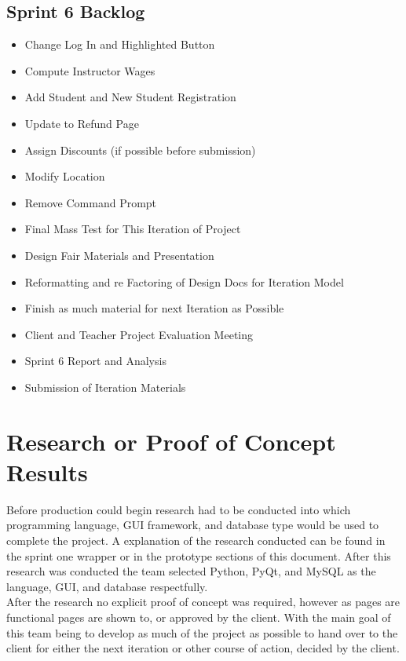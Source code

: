 \subsection{Sprint 6 Backlog}
\begin{itemize}
\item Change Log In and Highlighted Button
\item Compute Instructor Wages
\item Add Student and New Student Registration 
\item Update to Refund Page
\item Assign Discounts (if possible before submission) 
\item Modify Location
\item Remove Command Prompt 
\item Final Mass Test for This Iteration of Project
\item Design Fair Materials and Presentation
\item Reformatting and re Factoring of Design Docs for Iteration Model
\item Finish as much material for next Iteration as Possible
\item Client and Teacher Project Evaluation Meeting
\item Sprint 6 Report and Analysis
\item Submission of Iteration Materials 
\end{itemize}




\section{Research or Proof of Concept Results}
Before production could begin research had to be conducted into which programming language, GUI framework, and database type would be used to complete the project. A explanation of the research conducted can be found in the sprint one wrapper or in the prototype sections of this document. After this research was conducted the team selected Python, PyQt, and MySQL as the language, GUI, and database respectfully.\\
After the research no explicit proof of concept was required, however as pages are functional pages are shown to, or approved by the client. With the main goal of this team being to develop as much of the project as possible to hand over to the client for either the next iteration or other course of action, decided by the client. 


